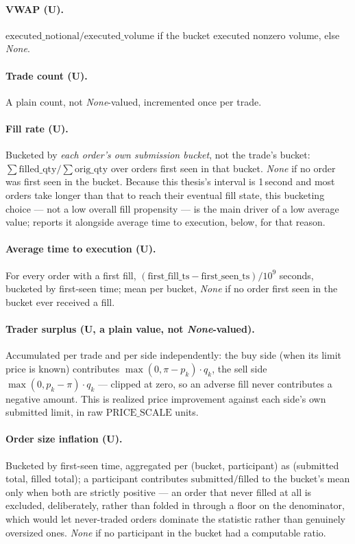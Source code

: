 \paragraph{VWAP (U).} $\mathrm{executed\_notional}/\mathrm{executed\_volume}$
if the bucket executed nonzero volume, else \emph{None}.

\paragraph{Trade count (U).} A plain count, not \emph{None}-valued,
incremented once per trade.

\paragraph{Fill rate (U).} Bucketed by \emph{each order's own submission
bucket}, not the trade's bucket: $\sum \mathrm{filled\_qty} / \sum
\mathrm{orig\_qty}$ over orders first seen in that bucket. \emph{None} if
no order was first seen in the bucket. Because this thesis's interval is
1\,second and most orders take longer than that to reach their eventual
fill state, this bucketing choice --- not a low overall fill propensity
--- is the main driver of a low average value;  reports
it alongside average time to execution, below, for that reason.

\paragraph{Average time to execution (U).}
For every order with a first fill, $(\text{first\_fill\_ts} -
\text{first\_seen\_ts})/10^{9}$ seconds, bucketed by first-seen time;
mean per bucket, \emph{None} if no order first seen in the bucket ever
received a fill.

\paragraph{Trader surplus (U, a plain value, not \emph{None}-valued).}
Accumulated per trade and per side independently: the buy side (when its
limit price is known) contributes $\max(0, \pi - p_k) \cdot q_k$, the
sell side $\max(0, p_k - \pi) \cdot q_k$ --- clipped at zero, so an
adverse fill never contributes a negative amount. This is realized
price improvement against each side's own submitted limit, in raw
$\mathrm{PRICE\_SCALE}$ units.

\paragraph{Order size inflation (U).} Bucketed by first-seen time,
aggregated per (bucket, participant) as (submitted total, filled total);
a participant contributes $\mathrm{submitted}/\mathrm{filled}$ to the
bucket's mean only when both are strictly positive --- an order that
never filled at all is excluded, deliberately, rather than folded in
through a floor on the denominator, which would let never-traded orders
dominate the statistic rather than genuinely oversized ones.
\emph{None} if no participant in the bucket had a computable ratio.

